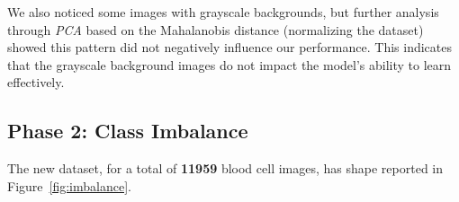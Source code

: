 \documentclass[11pt]{article}
\begin{document}
\begin{multicols*}{2}
        We also noticed some images with grayscale backgrounds, but further analysis through \textit{PCA} based on the Mahalanobis distance \cite{outliers} (normalizing the dataset) showed this pattern did not negatively influence our performance. This indicates that the grayscale background images do not impact the model's ability to learn effectively. 



        \subsection{Phase 2: Class Imbalance}

        The new dataset, for a total of \textbf{11959} blood cell images, has shape reported in Figure~\ref{fig:imbalance}.



\end{multicols*}
\end{document}
